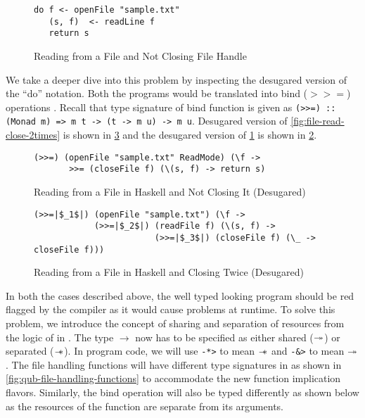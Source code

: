 \begin{figure}[h]
  \begin{framed}
    \begin{verbatim}
do f <- openFile "sample.txt"
   (s, f)  <- readLine f
   return s
    \end{verbatim}
  \end{framed}
  \caption{Reading from a File and Not Closing File Handle}
  \label{fig:file-read-noclose}
\end{figure}

We take a deeper dive into this problem by inspecting the desugared version of the ``do'' notation.
Both the programs would be translated into bind ($>>=$) operations . Recall that type signature of bind function is given as
\texttt{(>>=) :: (Monad m) => m t -> (t -> m u) -> m u}. Desugared version of \cref{fig:file-read-close-2times}
is shown in \cref{fig:file-read-close-2times-desugared} and the desugared version of \cref{fig:file-read-noclose} is shown in \cref{fig:file-read-noclose-desugared}.

\begin{figure}[h]
\begin{framed}
\begin{verbatim}
(>>=) (openFile "sample.txt" ReadMode) (\f ->
       >>= (closeFile f) (\(s, f) -> return s)
\end{verbatim}
  \end{framed}
  \caption{Reading from a File in Haskell and Not Closing It (Desugared)}
  \label{fig:file-read-noclose-desugared}
\end{figure}

\begin{figure}[h]
  \begin{framed}
    \begin{verbatim}
(>>=|$_1$|) (openFile "sample.txt") (\f ->
            (>>=|$_2$|) (readFile f) (\(s, f) ->
                        (>>=|$_3$|) (closeFile f) (\_ -> closeFile f)))
    \end{verbatim}
  \end{framed}
  \caption{Reading from a File in Haskell and Closing Twice (Desugared)}
  \label{fig:file-read-close-2times-desugared}
\end{figure}

In both the cases described above, the well typed looking program should be red flagged by the compiler as it would
cause problems at runtime. To solve this problem, we introduce the %
concept of sharing and separation of resources from the logic of \BI{} in \qub{}. The type $\rightarrow$ now
has to be specified as either shared ($\twoheadrightarrow$) or separated ($\mathrel{-\mkern-6mu*}$). In \qub{} program code, we will use
\texttt{-*>} to mean $\mathrel{-\mkern-6mu*}$ and \texttt{-&>} to mean $\twoheadrightarrow$.
The file handling functions will have different type signatures in \qub{} as shown in \cref{fig:qub-file-handling-functions} to accommodate
the new function implication flavors. Similarly, the bind operation will also be typed differently as shown below as the resources of the function are
separate from its arguments.

